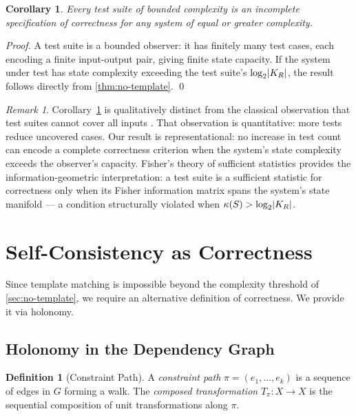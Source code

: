 \documentclass[twocolumn,a4paper,11pt]{article}
\theoremstyle{plain}
\newtheorem{corollary}[theorem]{Corollary}
\theoremstyle{definition}
\newtheorem{definition}[theorem]{Definition}
\theoremstyle{remark}
\newtheorem{remark}[theorem]{Remark}
\DeclarePairedDelimiter{\abs}{\lvert}{\rvert}
\begin{document}
\begin{corollary}
\label{cor:test-suite-incomplete}
Every test suite of bounded complexity is an incomplete specification of
correctness for any system of equal or greater complexity.
\end{corollary}

\begin{proof}
A test suite is a bounded observer: it has finitely many test cases, each
encoding a finite input-output pair, giving finite state capacity. If the
system under test has state complexity exceeding the test suite's
$\log_2 \abs{K_R}$, the result follows directly from \cref{thm:no-template}.
\qed
\end{proof}

\begin{remark}
Corollary~\ref{cor:test-suite-incomplete} is qualitatively distinct from
the classical observation that test suites cannot cover all inputs
\cite{dijkstra1972}. That observation is quantitative: more tests reduce
uncovered cases. Our result is representational: no increase in test count
can encode a complete correctness criterion when the system's state
complexity exceeds the observer's capacity. Fisher's theory of sufficient
statistics \cite{fisher1925} provides the information-geometric
interpretation: a test suite is a sufficient statistic for correctness only
when its Fisher information matrix spans the system's state manifold ---
a condition structurally violated when $\kappa(S) > \log_2 \abs{K_R}$.
\end{remark}

\section{Self-Consistency as Correctness}
\label{sec:hac}

Since template matching is impossible beyond the complexity threshold of
\cref{sec:no-template}, we require an alternative definition of
correctness. We provide it via holonomy.

\subsection{Holonomy in the Dependency Graph}

\begin{definition}[Constraint Path]
\label{def:constraint-path}
A \emph{constraint path} $\pi = (e_1, \ldots, e_k)$ is a sequence of
edges in $G$ forming a walk. The \emph{composed transformation}
$T_\pi: X \to X$ is the sequential composition of unit transformations
along $\pi$.
\end{definition}
\end{document}
